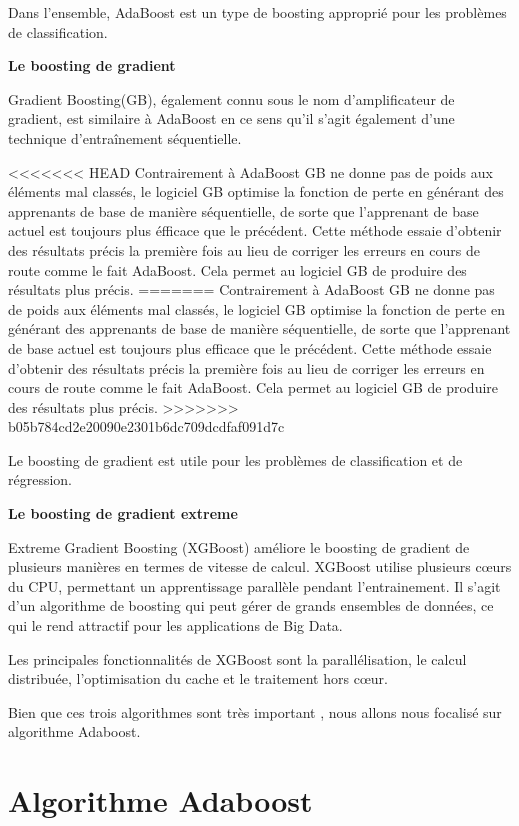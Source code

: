 \documentclass[french,a4paper,12pt]{article}
\begin{document}
\quad Dans l'ensemble, AdaBoost est un type de boosting approprié pour les problèmes de classification. 

\textbf{Le boosting de gradient}

\quad Gradient Boosting(GB), également connu sous le nom d’amplificateur de gradient, est similaire à AdaBoost en ce sens qu'il s'agit également d'une technique d'entraînement séquentielle.

<<<<<<< HEAD
\quad Contrairement à AdaBoost  GB ne donne pas de poids aux éléments mal classés,  le logiciel GB optimise la fonction de perte en générant des apprenants de base de manière séquentielle, de sorte que l'apprenant de base actuel est toujours plus éfficace que le précédent. Cette méthode essaie d'obtenir des résultats précis la première fois au lieu de corriger les erreurs en cours de route comme le fait AdaBoost\citep{educa}. Cela permet au logiciel GB de produire des résultats plus précis.
=======
\quad Contrairement à AdaBoost  GB ne donne pas de poids aux éléments mal classés,  le logiciel GB optimise la fonction de perte en générant des apprenants de base de manière séquentielle, de sorte que l'apprenant de base actuel est toujours plus efficace que le précédent. Cette méthode essaie d'obtenir des résultats précis la première fois au lieu de corriger les erreurs en cours de route comme le fait AdaBoost\citep{educa}. Cela permet au logiciel GB de produire des résultats plus précis.
>>>>>>> b05b784cd2e20090e2301b6dc709dcdfaf091d7c

\quad Le boosting de gradient est utile pour les problèmes de classification et de régression.




\textbf{Le boosting de gradient extreme}

\quad Extreme Gradient Boosting (XGBoost) améliore le boosting  de gradient de plusieurs manières en termes de vitesse de calcul\citep{mousa}. XGBoost utilise plusieurs cœurs du CPU, permettant un apprentissage parallèle pendant l’entrainement. Il s'agit d'un algorithme de boosting qui peut gérer de grands ensembles de données, ce qui le rend attractif pour les applications de Big Data. 

\quad Les principales fonctionnalités de XGBoost sont la parallélisation, le calcul distribuée, l'optimisation du cache et le traitement hors cœur.

\quad \quad Bien que ces trois algorithmes sont très important , nous allons nous focalisé sur algorithme Adaboost.

\section{Algorithme Adaboost}
\end{document}
